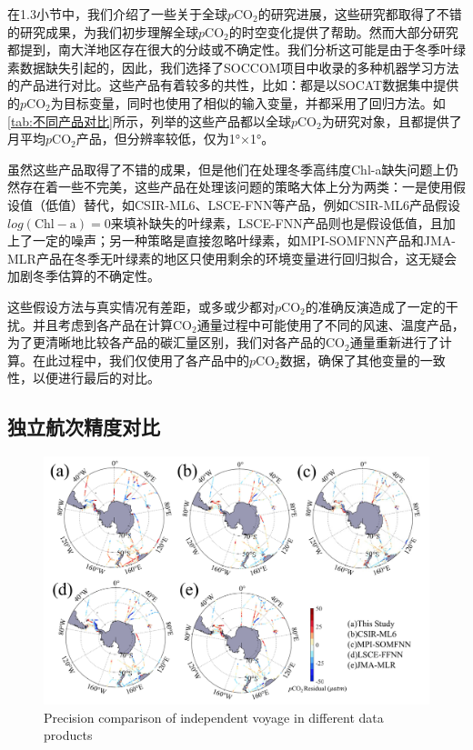 在1.3小节中，我们介绍了一些关于全球$p\mathrm{CO_2}$的研究进展，这些研究都取得了不错的研究成果，为我们初步理解全球$p\mathrm{CO_2}$的时空变化提供了帮助。然而大部分研究都提到，南大洋地区存在很大的分歧或不确定性\cite{CSIR_ML6,MPI_SOMFFN,socat2016}。我们分析这可能是由于冬季叶绿素数据缺失引起的，因此，我们选择了SOCCOM项目中收录的多种机器学习方法的产品进行对比。这些产品有着较多的共性，比如：都是以SOCAT数据集中提供的$p\mathrm{CO_2}$为目标变量，同时也使用了相似的输入变量，并都采用了回归方法。如\autoref{tab:不同产品对比}所示，列举的这些产品都以全球$p\mathrm{CO_2}$为研究对象，且都提供了月平均$p\mathrm{CO_2}$产品，但分辨率较低，仅为1°×1°。

虽然这些产品取得了不错的成果，但是他们在处理冬季高纬度Chl-a缺失问题上仍然存在着一些不完美，这些产品在处理该问题的策略大体上分为两类：一是使用假设值（低值）替代，如CSIR-ML6\cite{CSIR_ML6}、LSCE-FNN\cite{LSCE_FFNN}等产品，例如CSIR-ML6产品假设$log(\mathrm{Chl-a})=0$来填补缺失的叶绿素，LSCE-FNN产品则也是假设低值，且加上了一定的噪声；另一种策略是直接忽略叶绿素，如MPI-SOMFNN产品\cite{MPI_SOMFFN}和JMA-MLR产品\cite{JMA_MLR}在冬季无叶绿素的地区只使用剩余的环境变量进行回归拟合，这无疑会加剧冬季估算的不确定性。

这些假设方法与真实情况有差距，或多或少都对$p\mathrm{CO_2}$的准确反演造成了一定的干扰。并且考虑到各产品在计算$\mathrm{CO_2}$通量过程中可能使用了不同的风速、温度产品，为了更清晰地比较各产品的碳汇量区别，我们对各产品的$\mathrm{CO_2}$通量重新进行了计算。在此过程中，我们仅使用了各产品中的$p\mathrm{CO_2}$数据，确保了其他变量的一致性，以便进行最后的对比。

\subsection{独立航次精度对比}
\begin{figure}[htbp]
    \centering
    \includegraphics[width=\linewidth]{figure/第四章用图/精度对比.jpg}
    {Precision comparison of independent voyage in different data products  }
\end{figure}

